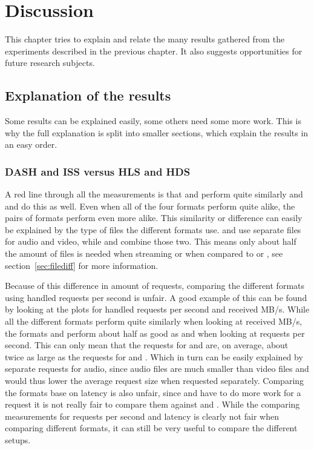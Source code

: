 \documentclass[twoside,openright]{uva-bachelor-thesis}
\begin{document}
\chapter{Discussion}
This chapter tries to explain and relate the many results gathered from the
experiments described in the previous chapter. It also suggests opportunities for
future research subjects.

\section{Explanation of the results}
Some results can be explained easily, some others need some more
work. This is why the full explanation is split into smaller sections, which
explain the results in an easy order.


\subsection{DASH and ISS versus HLS and HDS}\label{sec:audiovs}
A red line through all the measurements is that \hls and \hds perform
quite similarly and \dash and \iss do this as well. Even when all of the four
formats perform quite alike, the pairs of formats perform even more alike.
This similarity or difference can easily be explained by the type of files the
different formats use. \dash and \iss use
separate files for audio and video, while \hls and \hds combine those two. This
means only about half the amount of files is needed when streaming \hls or \hds
when compared to \dash or \iss, see section~\ref{sec:filediff} for more
information.

Because of this difference in amount of requests, comparing the different
formats using handled requests per second is unfair. A good example of
this can be found by looking at the plots for handled requests per second and
received MB/s. While all the different formats perform quite similarly when
looking at received MB/s, the formats \hls and \hds perform about half as good as
\dash and \iss when looking at requests per second. This can only mean that the
requests for \hds and \hls are, on average, about twice as large as the requests
for \dash and \iss. Which in turn can be easily explained by separate requests
for audio, since audio files are much smaller than video files and would thus
lower the average request size when requested separately. Comparing the formats
base on latency is also unfair, since \hls and \hds have to do more work for a
request it is not really fair to compare them against \dash and \iss. While the
comparing measurements for requests per second and latency is clearly not fair
when comparing different formats, it can still be very useful to compare the
different setups.
\end{document}
